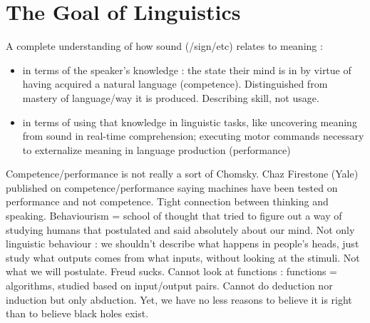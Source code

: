 \documentclass{cours}
\begin{document}
\section{The Goal of Linguistics}
A complete understanding of how sound (/sign/etc) relates to meaning : 
\begin{itemize}
    \item in terms of the speaker's knowledge : the state their mind is in by virtue of having acquired a natural language (competence). Distinguished from mastery of language/way it is produced. Describing skill, not usage. 
    \item in terms of using that knowledge in linguistic tasks, like uncovering meaning from sound in real-time comprehension; executing motor commands necessary to externalize meaning in language production (performance)
\end{itemize}
Competence/performance is not really a sort of Chomsky. Chaz Firestone (Yale) published on competence/performance saying machines have been tested on performance and not competence. 
Tight connection between thinking and speaking. 
Behaviourism = school of thought that tried to figure out a way of studying humans that postulated and said absolutely about our mind. Not only linguistic behaviour : we shouldn't describe what happens in people's heads, just study what outputs comes from what inputs, without looking at the stimuli. Not what we will postulate. 
Freud sucks.
Cannot look at functions : functions = algorithms, studied based on input/output pairs. Cannot do deduction nor induction but only abduction. Yet, we have no less reasons to believe it is right than to believe black holes exist.
\end{document}
